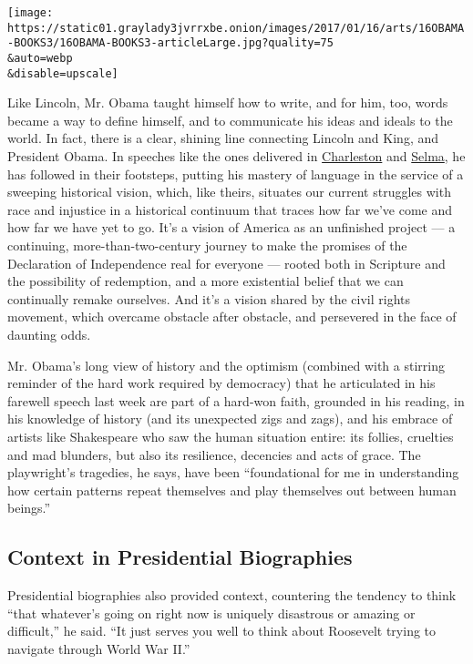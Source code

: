 \texttt{[image: https://static01.graylady3jvrrxbe.onion/images/2017/01/16/arts/16OBAMA-BOOKS3/16OBAMA-BOOKS3-articleLarge.jpg?quality=75\\\&auto=webp\\\&disable=upscale]}

Like Lincoln, Mr. Obama taught himself how to write, and for him, too,
words became a way to define himself, and to communicate his ideas and
ideals to the world. In fact, there is a clear, shining line connecting
Lincoln and King, and President Obama. In speeches like the ones
delivered in
\href{https://www.nytimes3xbfgragh.onion/2015/07/04/arts/obamas-eulogy-which-found-its-place-in-history.html?_r=0}{Charleston}
and
\href{https://www.nytimes3xbfgragh.onion/2015/03/08/us/obama-in-selma-for-edmund-pettus-bridge-attack-anniversary.html}{Selma},
he has followed in their footsteps, putting his mastery of language in
the service of a sweeping historical vision, which, like theirs,
situates our current struggles with race and injustice in a historical
continuum that traces how far we've come and how far we have yet to go.
It's a vision of America as an unfinished project --- a continuing,
more-than-two-century journey to make the promises of the Declaration of
Independence real for everyone --- rooted both in Scripture and the
possibility of redemption, and a more existential belief that we can
continually remake ourselves. And it's a vision shared by the civil
rights movement, which overcame obstacle after obstacle, and persevered
in the face of daunting odds.

Mr. Obama's long view of history and the optimism (combined with a
stirring reminder of the hard work required by democracy) that he
articulated in his farewell speech last week are part of a hard-won
faith, grounded in his reading, in his knowledge of history (and its
unexpected zigs and zags), and his embrace of artists like Shakespeare
who saw the human situation entire: its follies, cruelties and mad
blunders, but also its resilience, decencies and acts of grace. The
playwright's tragedies, he says, have been ``foundational for me in
understanding how certain patterns repeat themselves and play themselves
out between human beings.''

\hypertarget{context-in-presidential-biographies}{%
\subsection{Context in Presidential
Biographies}\label{context-in-presidential-biographies}}

Presidential biographies also provided context, countering the tendency
to think ``that whatever's going on right now is uniquely disastrous or
amazing or difficult,'' he said. ``It just serves you well to think
about Roosevelt trying to navigate through World War II.''


